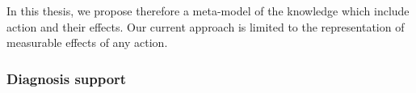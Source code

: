 In this thesis, we propose therefore a meta-model of the knowledge which include action and their effects.
Our current approach is limited to the representation of measurable effects of any action.


\subsubsection{Diagnosis support}

%
%
